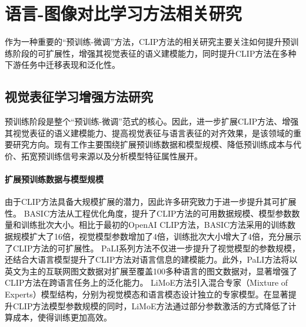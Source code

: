 
\section{语言-图像对比学习方法相关研究}
\label{sec:clip-related}
作为一种重要的“预训练-微调”方法，CLIP方法的相关研究主要关注如何提升预训练阶段的可扩展性，增强其视觉表征的语义建模能力，同时提升CLIP方法在多种下游任务中迁移表现和泛化性。

\subsection{视觉表征学习增强方法研究}
预训练阶段是整个“预训练-微调”范式的核心。因此，进一步扩展CLIP方法、增强其视觉表征的语义建模能力、提高视觉表征与语言表征的对齐效果，是该领域的重要研究方向。现有工作主要围绕扩展预训练数据和模型规模、降低预训练成本与代价、拓宽预训练信号来源以及分析模型特征属性展开。

\paragraph{扩展预训练数据与模型规模} 由于CLIP方法具备大规模扩展的潜力，因此许多研究致力于进一步提升其可扩展性。
BASIC方法\cite{pham2023combined}从工程优化角度，提升了CLIP方法的可用数据规模、模型参数数量和训练批次大小。相比于最初的OpenAI CLIP方法\cite{radford2021learning}，BASIC方法采用的训练数据规模扩大了16倍，视觉模型参数增加了4倍，训练批次大小增大了4倍，充分展示了CLIP方法的可扩展性。
PaLI系列方法\cite{pali,palix}不仅进一步提升了视觉模型的参数规模，还结合大语言模型提升了CLIP方法对语言信息的建模能力。此外，PaLI方法将以英文为主的互联网图文数据对扩展至覆盖100多种语言的图文数据对，显著增强了CLIP方法在跨语言任务上的泛化能力。
LiMoE方法\cite{LiMoE}引入混合专家\cite{gshard}（Mixture of Experts）模型结构，分别为视觉模态和语言模态设计独立的专家模型。在显著提升CLIP方法模型参数规模的同时，LiMoE方法通过部分参数激活的方式降低了计算成本，使得训练更加高效。

